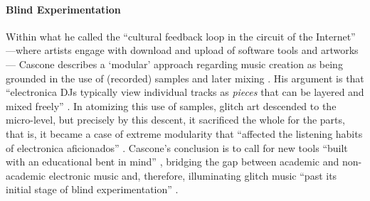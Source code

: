 \paragraph{Blind Experimentation}
Within what he called the ``cultural feedback loop in the circuit of the Internet'' ---where artists engage with download and upload of software tools and artworks--- Cascone describes a `modular' approach regarding music creation as being grounded in the use of (recorded) samples and later mixing \parencite[17]{Cas00:The}. His argument is that ``electronica DJs typically view individual tracks as \textit{pieces} that can be layered and mixed freely'' \im \parencite[17]{Cas00:The}. In atomizing this use of samples, glitch art descended to the micro-level, but precisely by this descent, it sacrificed the whole for the parts, that is, it became a case of extreme modularity that ``affected the listening habits of electronica aficionados'' \parencite[17]{Cas00:The}. Cascone's conclusion is to call for new tools ``built with an educational bent in mind'' \parencite[17]{Cas00:The}, bridging the gap between academic and non-academic electronic music and, therefore, illuminating glitch music ``past its initial stage of blind experimentation'' \parencite[17]{Cas00:The}. 

